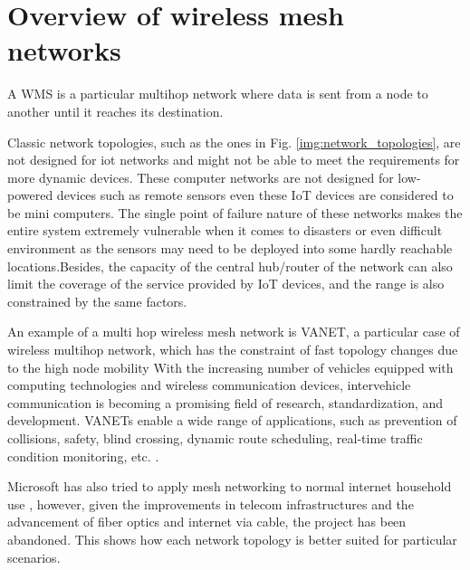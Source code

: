 	\section{Overview of wireless mesh networks}
	
		A WMS is a particular multihop network where data is sent from a node to another until it reaches its destination.
		
		
		Classic network topologies, such as the ones in Fig. \ref{img:network_topologies}, are not designed for iot networks and might not be able to meet the requirements for more dynamic devices.		
		These computer networks are not designed for low-powered devices such as remote sensors even these IoT devices are considered to be mini computers.
		The single point of failure nature of these networks makes the entire system extremely vulnerable when it comes to disasters or even difficult environment as the sensors may need to be deployed into some hardly reachable locations.Besides, the capacity of the central hub/router of the network can also limit the coverage of the service provided by IoT devices, and the range is also constrained by the same factors.
		
		An example of a multi hop wireless mesh network is VANET, a particular case of wireless multihop network, which has the constraint of fast topology changes due to the high node mobility With the increasing number of vehicles equipped with computing technologies and wireless communication devices, intervehicle communication is becoming a promising field of research, standardization, and development. VANETs enable a wide range of applications, such as prevention of collisions, safety, blind crossing, dynamic route scheduling, real-time traffic condition monitoring, etc. \cite{BADIS2015653}.
		
		Microsoft has also tried to apply mesh networking to normal internet household use \cite{bahl2009opportunistic}, however, given the improvements in telecom infrastructures and the advancement of fiber optics and internet via cable, the project has been abandoned.
		This shows how each network topology is better suited for particular scenarios.
		
